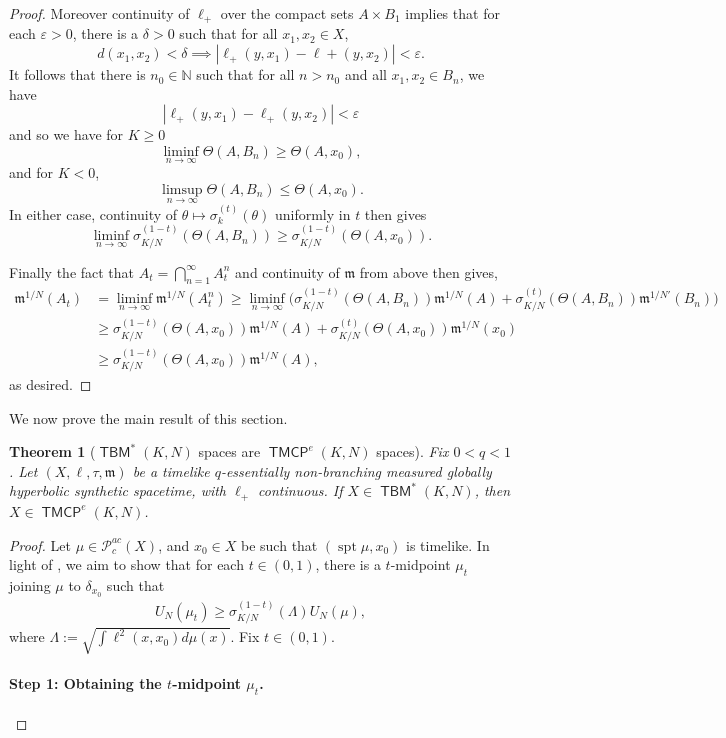 \documentclass{article}
\renewcommand{\epsilon}{\varepsilon}
\newcommand{\N}{\mathbb{N}}
\newcommand{\m}{\mathfrak{m}}
\DeclareMathOperator{\spt}{spt}
\newcommand{\Pcal}{\mathcal{P}}
\DeclareMathOperator{\TBM}{\mathsf{TBM}}
\DeclareMathOperator{\TMCP}{\mathsf{TMCP}}
\newtheorem{theorem}{Theorem}[section]
\theoremstyle{definition}
\begin{document}
{\begin{proof}
Moreover continuity of $\ell_+$ over the compact sets $A\times B_1$ implies that for each $\epsilon>0$, there is a $\delta>0$ such that for all $x_1,x_2\in X$, 
\[d(x_1,x_2)<\delta\implies |\ell_+(y,x_1)-\ell+(y,x_2)|<\epsilon.\]
It follows that there is $n_0\in \N$ such that for all $n>n_0$ and all $x_1,x_2\in B_n$, we have 
\[|\ell_+(y,x_1)-\ell_+(y,x_2)|<\epsilon\]
and so we have for $K\geq 0$
\[\liminf_{n\to\infty} \Theta(A,B_n)\geq \Theta(A,x_0),\]
and for $K<0$, 
\[\limsup_{n\to\infty} \Theta(A,B_n)\leq \Theta(A,x_0).\]
In either case, continuity of $\theta\mapsto \sigma_{k}^{(t)}(\theta)$ uniformly in $t$ then gives
\[\liminf_{n\to\infty} \sigma_{K/N}^{(1-t)}(\Theta(A,B_n))\geq \sigma_{K/N}^{(1-t)}(\Theta(A,x_0)).\]

Finally the fact that $A_t=\bigcap_{n=1}^\infty A_t^n$ and continuity of $\m$ from above then gives,
\begin{align*}
\m^{1/N}(A_t)&=\liminf_{n\to\infty} \m^{1/N}(A_t^n) \geq \liminf_{n\to\infty}\Big( \sigma_{K/N}^{(1-t)}(\Theta(A,B_n))\m^{1/N}(A)+ \sigma_{K/N}^{(t)}(\Theta(A,B_n))\m^{1/N'}(B_n)\Big)\\
&\geq \sigma_{K/N}^{(1-t)}(\Theta(A,x_0))\m^{1/N}(A)+ \sigma_{K/N}^{(t)}(\Theta(A,x_0))\m^{1/N}(x_0)\\
&\geq \sigma_{K/N}^{(1-t)}(\Theta(A,x_0))\m^{1/N}(A),
\end{align*}
as desired.
\end{proof}

We now prove the main result of this section. 
\begin{theorem}[$\TBM^*(K,N)$ spaces are $\TMCP^e(K,N)$ spaces]\label{TBMtoTMCP} Fix $0<q<1$. Let $(X,\ell,\tau,\m)$ be a timelike $q$-essentially non-branching measured globally hyperbolic synthetic spacetime, with $\ell_+$ continuous. If $X\in \TBM^*(K,N)$, then $X\in \TMCP^e(K,N)$. 
\end{theorem}
\begin{proof}
Let $\mu\in\Pcal_c^{ac}(X)$, and $x_0\in X$ be such that $(\spt\mu,x_0)$ is timelike. In light of , we aim to show that for each $t\in(0,1)$, there is a $t$-midpoint $\mu_t$ joining $\mu$ to $\delta_{x_0}$ such that 
\begin{align}\label{convexityinequality1}
U_N(\mu_t)\geq\sigma_{K/N}^{(1-t)}(\Lambda)U_N(\mu),
\end{align}
where $\Lambda:= \sqrt{\int \ell^2(x,x_0)d\mu(x)}$. Fix $t\in (0,1)$.


\paragraph{Step 1: Obtaining the $t$-midpoint $\mu_t$.}


\end{proof}}
\end{document}
